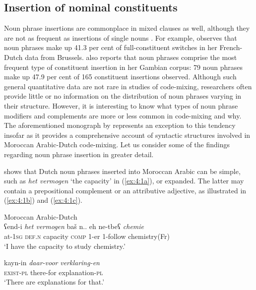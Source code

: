 \subsection{Insertion of nominal constituents}{\label{nominal-constituents}}
Noun phrase insertions are commonplace in mixed clauses as well, although they are not as frequent as insertions of single nouns \citep[cf.][]{poplack-sometimes-1980}. For example, \citet[205]{treffers-daller-mixing-1994} observes that noun phrases make up 41.3 per cent of full-constituent switches in her French-Dutch data from Brussels. \citet[165]{haust-codeswitching-1995} also reports that noun phrases comprise the most frequent type of constituent insertion in her Gambian corpus: 79 noun phrases make up 47.9 per cent of 165 constituent insertions observed. Although such general quantitative data are not rare in studies of code-mixing, researchers often provide little or no information on the distribution of noun phrases varying in their structure. However, it is interesting to know what types of noun phrase modifiers and complements are more or less common in code-mixing and why. The aforementioned monograph by \citet{boumans-syntax-1998} represents an exception to this tendency insofar as it provides a comprehensive account of syntactic structures involved in Moroccan Arabic-Dutch code-mixing. Let us consider some of the findings regarding noun phrase insertion in greater detail. 

\citet{boumans-syntax-1998} shows that Dutch noun phrases inserted into Moroccan Arabic can be simple, such as \textit{het vermogen} `the capacity' in ({\ref{ex:4:1a}}), or expanded. The latter may contain a prepositional complement or an attributive adjective, as illustrated in (\ref{ex:4:1b}) and (\ref{ex:4:1c}).

\ea
Moroccan Arabic-Dutch \citep[212, 199, 212]{boumans-syntax-1998}\\

\ea{\label{ex:4:1a}}
\gll ʕend-i \textit{het vermogen} baš n.. eh ne-tbeʕ \textit{chemie}\\
    at-\textsc{1sg} \textsc{def.n} capacity \textsc{comp} 1-er 1-follow chemistry(Fr)\\
\glt `I have the capacity to study chemistry.'

\ex{\label{ex:4:1b}}
\gll kayn-in \textit{daar-voor} \textit{verklaring-en}\\
	\textsc{exist-pl} there-for explanation-\textsc{pl}\\
\glt `There are explanations for that.' 

